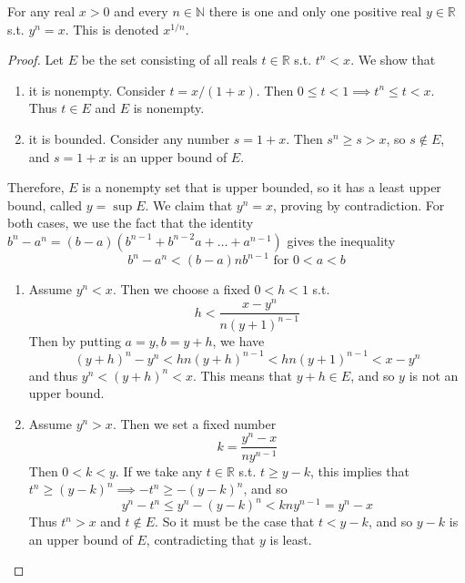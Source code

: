   \begin{theorem}
    For any real $x > 0$ and every $n \in \mathbb{N}$ there is one and only one positive real $y \in \mathbb{R}$ s.t. $y^n = x$. This is denoted $x^{1/n}$. 
  \end{theorem}
  \begin{proof}
    Let $E$ be the set consisting of all reals $t \in \mathbb{R}$ s.t. $t^n < x$. We show that 
    \begin{enumerate}
      \item it is nonempty. Consider $t = x/(1+x)$. Then $0 \leq t < 1 \implies t^n \leq t < x$. Thus $t \in E$ and $E$ is nonempty. 
      \item it is bounded. Consider any number $s = 1 + x$. Then $s^n \geq s > x$, so $s \not\in E$, and $s = 1 + x$ is an upper bound of $E$. 
    \end{enumerate}
    Therefore, $E$ is a nonempty set that is upper bounded, so it has a least upper bound, called $y = \sup{E}$. We claim that $y^n = x$, proving by contradiction. For both cases, we use the fact that the identity $b^n - a^n = (b - a) (b^{n-1} + b^{n-2} a + \ldots + a^{n-1})$ gives the inequality 
    \begin{equation}
      b^n - a^n < (b-a) n b^{n-1} \text{ for } 0 < a < b
    \end{equation}
    \begin{enumerate}
      \item Assume $y^n < x$. Then we choose a fixed $0 < h < 1$ s.t. 
      \begin{equation}
        h < \frac{x - y^n}{n(y + 1)^{n-1}}
      \end{equation}
      Then by putting $a = y, b = y + h$, we have 
      \begin{equation}
        (y + h)^n - y^n < hn (y + h)^{n-1} < hn (y + 1)^{n-1} < x - y^n 
      \end{equation}
      and thus $y^n < (y + h)^n < x$. This means that $y + h \in E$, and so $y$ is not an upper bound. 

      \item Assume $y^n > x$. Then we set a fixed number 
      \begin{equation}
        k = \frac{y^n - x}{n y^{n-1}} 
      \end{equation}
      Then $0 < k < y$. If we take any $t \in \mathbb{R}$ s.t. $t \geq y - k$, this implies that $t^n \geq (y -k)^n \implies -t^n \geq -(y - k)^n$, and so 
      \begin{equation}
        y^n - t^n \leq y^n - (y - k)^n < k ny^{n-1} = y^n - x
      \end{equation}
      Thus $t^n > x$ and $t \not\in E$. So it must be the case that $t < y - k$, and so $y - k$ is an upper bound of $E$, contradicting that $y$ is least. 
    \end{enumerate}
  \end{proof}

